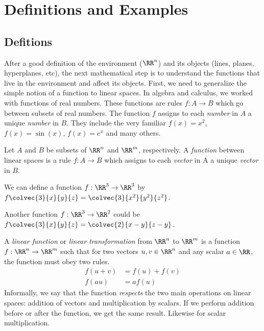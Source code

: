 \documentclass[fleqn]{report}
\begin{document}
\section{Definitions and Examples}
\label{linear-transformations-defintions-and-examples}

\subsection{Defitions}
\label{linear-transformations-defintions}

After a good definition of the environment ($\RR^n$) and its
objects (lines, planes, hyperplanes, etc), the next
mathematical step is to understand the functions that live in
the environment and affect its objects.
First, we need to generalize the simple notion of a function
to linear spaces. In algebra and calculus, we worked with
functions of real numbers. These functions are rules $f: A
\rightarrow B$ which go between subsets of real numbers. The
function $f$ assigns to each \emph{number} in $A$ a unique
\emph{number} in $B$. They include the very familiar $f(x) =
x^2$, $f(x) = \sin (x)$, $f(x) = e^x$ and many others.

\begin{defn}
Let $A$ and $B$ be subsets of $\RR^n$ and $\RR^m$,
respectively. A \emph{function} between linear spaces is a
rule $f: A \rightarrow B$ which assigns to each \emph{vector} in
A a unique \emph{vector} in $B$.
\end{defn}

\begin{example}
We can define a function $f: \RR^3 \rightarrow \RR^3$ by 
$f\colvec{3}{x}{y}{z} = \colvec{3}{x^2}{y^2}{z^2}$.
\end{example}

\begin{example}
Another function $f: \RR^3 \rightarrow \RR^2$ could be
$f\colvec{3}{x}{y}{z} = \colvec{2}{x-y}{z-y}$.
\end{example}

\begin{defn}
A \emph{linear function} or \emph{linear transformation} from
$\RR^n$ to $\RR^m$ is a function $f: \RR^n \rightarrow \RR^m$
such that for two vectors $u,v \in \RR^n$ and any scalar $a
\in \RR$, the function must obey two rules.
\begin{align*}
f(u+v) & = f(u) + f(v) \\
f(au) & = af(u)
\end{align*}
Informally, we say that the function \emph{respects} the two
main operations on linear spaces: addition of vectors and
multiplication by scalars. If we perform addition before or
after the function, we get the same result. Likewise for
scalar multiplication.
\end{defn}
\end{document}
